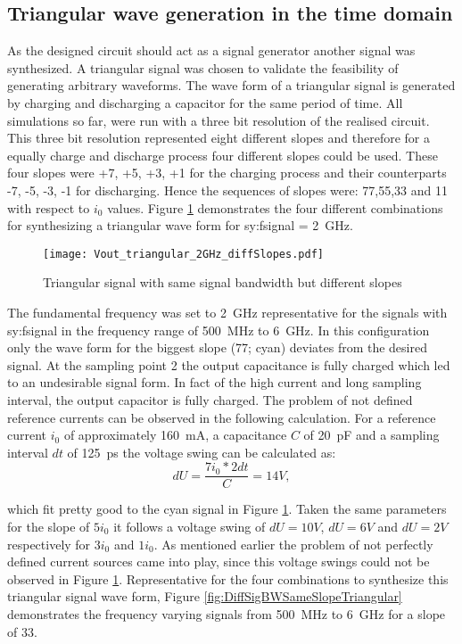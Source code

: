 \subsection{Triangular wave generation in the time domain}
As the designed circuit should act as a signal generator another signal was synthesized.
A triangular signal was chosen to validate the feasibility of generating arbitrary waveforms.
The wave form of a triangular signal is generated by charging and discharging a capacitor for the same period of time.
All simulations so far, were run with a three bit resolution of the realised circuit.
This three bit resolution represented eight different slopes and therefore for a equally charge and discharge process four different slopes could be used.
These four slopes were +7, +5, +3, +1 for the charging process and their counterparts -7, -5, -3, -1 for discharging.
Hence the sequences of slopes were: 77,55,33 and 11 with respect to $i_0$ values.
Figure \ref{fig:DiffSlopeSameBWTriangular} demonstrates the four different combinations for synthesizing a triangular wave form for \gls{sy:fsignal} = \SI{2}{\giga \hertz}.

\begin{figure}[htb!]
	\centering
  \texttt{[image: Vout\_triangular\_2GHz\_diffSlopes.pdf]}
	\caption{Triangular signal with same signal bandwidth but different slopes}
	\label{fig:DiffSlopeSameBWTriangular}
\end{figure}

The fundamental frequency was set to \SI{2}{\giga \hertz} representative for the signals with \gls{sy:fsignal} in the frequency range of \SI{500}{\mega \hertz} to \SI{6}{\giga \hertz}.
In this configuration only the wave form for the biggest slope (77; cyan) deviates from the desired signal.
At the sampling point 2 the output capacitance is fully charged which led to an undesirable signal form.
In fact of the high current and long sampling interval, the output capacitor is fully charged.
The problem of not defined reference currents can be observed in the following calculation.
For a reference current $i_0$ of approximately \SI{160}{\milli \ampere}, a capacitance $C$ of \SI{20}{\pico \farad} and a sampling interval $dt$ of \SI{125}{\pico \second} the voltage swing can be calculated as:
\begin{equation}
	dU = \frac{7 i_0*2 dt }{C} = 14 V,
\end{equation}

which fit pretty good to the cyan signal in Figure \ref{fig:DiffSlopeSameBWTriangular}.
Taken the same parameters for the slope of $5 i_0$ it follows a voltage swing of $dU = 10 V$, $dU = 6 V$ and $dU = 2 V$ respectively for $3 i_0$ and $1 i_0$.
As mentioned earlier the problem of not perfectly defined current sources came into play, since this voltage swings could not be observed in Figure \ref{fig:DiffSlopeSameBWTriangular}. 
Representative for the four combinations to synthesize this triangular signal wave form, 
Figure \ref{fig:DiffSigBWSameSlopeTriangular} demonstrates the frequency varying signals from \SI{500}{\mega \hertz} to \SI{6}{\giga \hertz} for a slope of 33.


